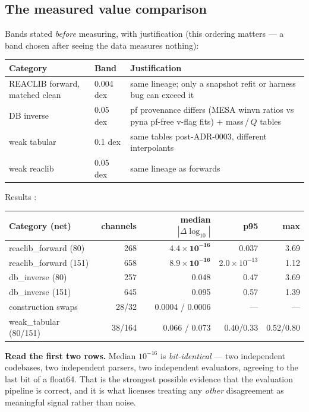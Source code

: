 \subsection{The measured value comparison}
\label{sec:measured-values}

Bands stated \emph{before} measuring, with justification (this ordering matters
--- a band chosen after seeing the data measures nothing):

\begin{center}
\begin{tabularx}{\textwidth}{@{}L{4.4cm} L{1.6cm} Y@{}}
\toprule
\textbf{Category} & \textbf{Band} & \textbf{Justification} \\
\midrule
REACLIB forward, matched clean & 0.004 dex &
  same lineage; only a snapshot refit or harness bug can exceed it \\
DB inverse & 0.05 dex &
  pf provenance differs (MESA winvn ratios vs pyna pf-free v-flag fits) $+$
  mass\,/\,$Q$ tables \\
weak tabular & 0.1 dex & same tables post-ADR-0003, different interpolants \\
weak reaclib & 0.05 dex & same lineage as forwards \\
\bottomrule
\end{tabularx}
\end{center}

Results :

\begin{center}
\begin{tabular}{@{}lrrrr@{}}
\toprule
\textbf{Category (net)} & \textbf{channels} & \textbf{median $|\Delta\log_{10}|$}
  & \textbf{p95} & \textbf{max} \\
\midrule
reaclib\_forward (80)  & 268 & $\mathbf{4.4\times10^{-16}}$ & 0.037
  & 3.69 \\
reaclib\_forward (151) & 658 & $\mathbf{8.9\times10^{-16}}$
  & $2.0\times10^{-13}$ & 1.12 \\
db\_inverse (80)  & 257 & 0.048 & 0.47 & 3.69 \\
db\_inverse (151) & 645 & 0.095 & 0.57 & 1.39 \\
construction swaps & 28/32 & 0.0004 / 0.0006 & --- & --- \\
weak\_tabular (80/151) & 38/164 & 0.066 / 0.073 & 0.40/0.33 & 0.52/0.80 \\
\bottomrule
\end{tabular}
\end{center}

\begin{result}
\textbf{Read the first two rows.} Median $10^{-16}$ is \emph{bit-identical} ---
two independent codebases, two independent parsers, two independent evaluators,
agreeing to the last bit of a float64. That is the strongest possible evidence
that the evaluation pipeline is correct, and it is what licenses treating any
\emph{other} disagreement as meaningful signal rather than noise.
\end{result}

